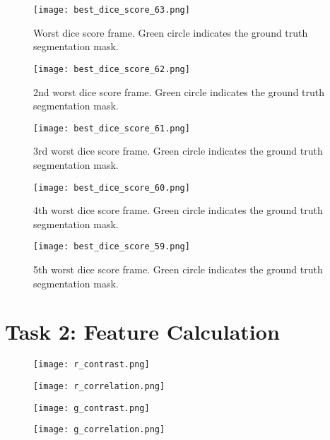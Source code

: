 \documentclass{report}
\begin{document}
\begin{appendices}
\begin{figure}
    \centering
    \texttt{[image: best\_dice\_score\_63.png]}
    \caption{Worst dice score frame. Green circle indicates the ground truth segmentation mask.}
\end{figure}
\begin{figure}
    \centering
    \texttt{[image: best\_dice\_score\_62.png]}
    \caption{2nd worst dice score frame. Green circle indicates the ground truth segmentation mask.}
\end{figure}
\begin{figure}
    \centering
    \texttt{[image: best\_dice\_score\_61.png]}
    \caption{3rd worst dice score frame. Green circle indicates the ground truth segmentation mask.}
\end{figure}
\begin{figure}
    \centering
    \texttt{[image: best\_dice\_score\_60.png]}
    \caption{4th worst dice score frame. Green circle indicates the ground truth segmentation mask.}
\end{figure}
\begin{figure}
    \centering
    \texttt{[image: best\_dice\_score\_59.png]}
    \caption{5th worst dice score frame. Green circle indicates the ground truth segmentation mask.}
\end{figure}

\pagebreak



\chapter{Task 2: Feature Calculation}\label{sec:app_task_2}

\begin{figure}
    \texttt{[image: r\_contrast.png]}
\end{figure}

\begin{figure}
    \texttt{[image: r\_correlation.png]}
\end{figure}

\begin{figure}
    \texttt{[image: g\_contrast.png]}
\end{figure}

\begin{figure}
    \texttt{[image: g\_correlation.png]}
\end{figure}


\end{appendices}
\end{document}
